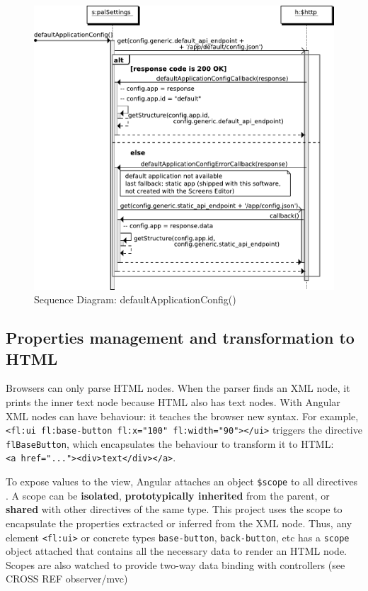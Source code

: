 \begin{figure}[htb]
    \centering
    \includegraphics{figures/design/seqdia/palSettings-defaultApplicationConfig.pdf}
    \caption{Sequence Diagram: defaultApplicationConfig()}
    \label{fig:design-seqdia-palSettings-defaultApplicationConfig}
\end{figure}

\FloatBarrier

\subsection{Properties management and transformation to \acs{HTML}}
Browsers can only parse \ac{HTML} nodes.
When the parser finds an \ac{XML} node, it prints the inner text node because \ac{HTML} also has text nodes.
With Angular \ac{XML} nodes can have behaviour: it teaches the browser new syntax.
For example, \\ \lstinline$<fl:ui fl:base-button fl:x="100" fl:width="90"></ui>$ triggers the directive \\ \lstinline$flBaseButton$, which encapsulates the behaviour to transform it to \ac{HTML}: \\ \lstinline$<a href="..."><div>text</div></a>$.

To expose values to the view, Angular attaches an object \texttt{\$scope} to all directives  .
A scope can be \textbf{isolated}, \textbf{prototypically inherited} from the parent, or \textbf{shared} with other directives of the same type.
This project uses the scope to encapsulate the properties extracted or inferred from the \ac{XML} node.
Thus, any element \lstinline$<fl:ui>$ or concrete types \lstinline$base-button$, \lstinline$back-button$, etc has a \texttt{scope} object attached that contains all the necessary data to render an \ac{HTML} node.
Scopes are also watched to provide two-way data binding with controllers (see CROSS REF observer/mvc)


